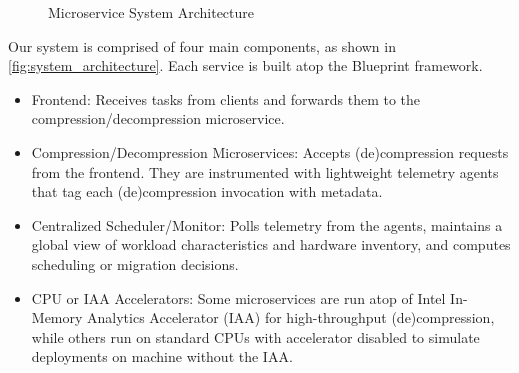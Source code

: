 \begin{figure}[ht]
  \centering
  \caption{Microservice System Architecture}
  \label{fig:system_architecture}
\end{figure}

Our system is comprised of four main components, as shown in \autoref{fig:system_architecture}. Each service is built atop the Blueprint framework.

\begin{itemize}
    \item Frontend: Receives tasks from clients and forwards them to the compression/decompression microservice.
    \item Compression/Decompression Microservices: Accepts (de)compression requests from the frontend. They are instrumented with lightweight telemetry agents that tag each (de)compression invocation with metadata.
    \item Centralized Scheduler/Monitor: Polls telemetry from the agents, maintains a global view of workload characteristics and hardware inventory, and computes scheduling or migration decisions.
    \item CPU or IAA Accelerators: Some microservices are run atop of Intel In-Memory Analytics Accelerator (IAA) for high-throughput (de)compression, while others run on standard CPUs with accelerator disabled to simulate deployments on machine without the IAA.
\end{itemize}

